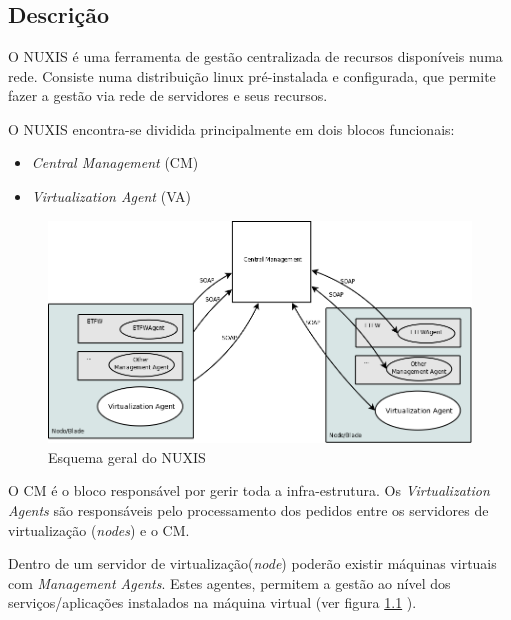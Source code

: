 \chapter{\textsf{\acronym}}
\section*{Descrição}
O NUXIS é uma ferramenta de gestão centralizada de recursos disponíveis numa rede. Consiste numa distribuição linux pré-instalada e configurada, que permite fazer a gestão via rede de servidores e seus recursos.

O NUXIS encontra-se dividida principalmente em dois blocos funcionais:

\begin{itemize}
	\item \emph{Central Management} (CM)
        \item \emph{Virtualization Agent} (VA)
\end{itemize}

\begin{figure}[H]
	\begin{center}
	\includegraphics[scale=0.35]{screenshots/etva_blocos.png}
	\caption{Esquema geral do NUXIS}
	\label{fig:etva_blocos}
	\end{center}
\end{figure}

O CM é o bloco responsável por gerir toda a infra-estrutura.
Os \emph{Virtualization Agents} são responsáveis pelo processamento dos pedidos entre os servidores de virtualização (\emph{nodes}) e o CM.

Dentro de um servidor de virtualização(\emph{node}) poderão existir máquinas virtuais com \emph{Management Agents}. Estes agentes, permitem a gestão ao nível dos serviços/aplicações instalados na máquina virtual (ver figura \ref{fig:etva_blocos} ).

